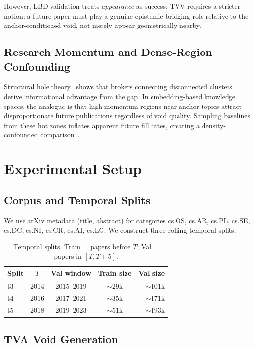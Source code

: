 \documentclass[sigconf]{acmart}
\newcommand{\tvv}{\textsf{TVV}}
\begin{document}
However, LBD validation treats \emph{appearance} as success.
\tvv{} requires a stricter notion: a future paper must play a genuine epistemic
bridging role relative to the anchor-conditioned void, not merely appear geometrically
nearby.

\subsection{Research Momentum and Dense-Region Confounding}

Structural hole theory~\cite{burt2004structural} shows that brokers connecting
disconnected clusters derive informational advantage from the gap.
In embedding-based knowledge spaces, the analogue is that high-momentum regions near
anchor topics attract disproportionate future publications regardless of void quality.
Sampling baselines from these hot zones inflates apparent future fill rates, creating
a density-confounded comparison~\cite{small1973cocitation}.

\section{Experimental Setup}
\label{sec:setup}

\subsection{Corpus and Temporal Splits}

We use arXiv metadata (title, abstract) for categories cs.OS, cs.AR, cs.PL, cs.SE,
cs.DC, cs.NI, cs.CR, cs.AI, cs.LG.
We construct three rolling temporal splits:

\begin{table}[h]
\centering
\caption{Temporal splits. Train = papers before $T$; Val = papers in $[T, T{+}5]$.}
\label{tab:splits}
\begin{tabular}{lcccr}
\toprule
Split & $T$ & Val window & Train size & Val size \\
\midrule
t3 & 2014 & 2015--2019 & $\sim$29k & $\sim$101k \\
t4 & 2016 & 2017--2021 & $\sim$35k & $\sim$171k \\
t5 & 2018 & 2019--2023 & $\sim$51k & $\sim$193k \\
\bottomrule
\end{tabular}
\end{table}

\subsection{TVA Void Generation}
\end{document}
